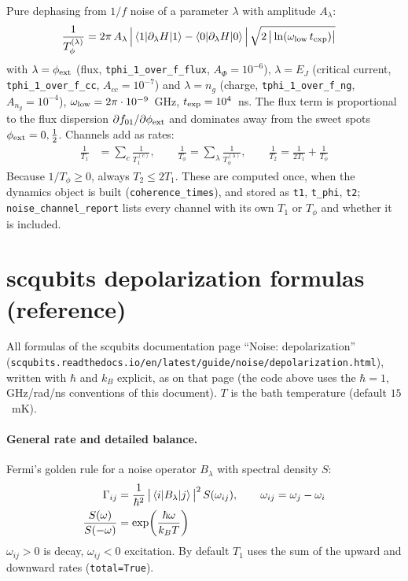 \documentclass[11pt]{article}
\begin{document}
Pure dephasing from $1/f$ noise of a parameter $\lambda$ with amplitude $A_\lambda$:
\begin{align}
  \frac{1}{T_\phi^{(\lambda)}} &= 2\pi\,A_\lambda\,
  \Big|\braket{1|\partial_\lambda H|1} - \braket{0|\partial_\lambda H|0}\Big|\,
  \sqrt{2\,\big|\ln(\omega_{\rm low}\,t_{\rm exp})\big|}
\end{align}
with $\lambda = \phi_{\rm ext}$ (flux, \texttt{tphi\_1\_over\_f\_flux}, $A_\Phi = 10^{-6}$),
$\lambda = E_J$ (critical current, \texttt{tphi\_1\_over\_f\_cc}, $A_{cc} = 10^{-7}$) and
$\lambda = n_g$ (charge, \texttt{tphi\_1\_over\_f\_ng}, $A_{n_g} = 10^{-4}$),
$\omega_{\rm low} = 2\pi\cdot 10^{-9}$~GHz, $t_{\rm exp} = 10^{4}$~ns. The flux term is
proportional to the flux dispersion $\partial f_{01}/\partial\phi_{\rm ext}$ and dominates away
from the sweet spots $\phi_{\rm ext} = 0, \tfrac12$.
Channels add as rates:
\begin{align}
  \frac{1}{T_1} &= \sum_{c} \frac{1}{T_1^{(c)}}, \qquad
  \frac{1}{T_\phi} = \sum_{\lambda} \frac{1}{T_\phi^{(\lambda)}}, \qquad
  \frac{1}{T_2} = \frac{1}{2T_1} + \frac{1}{T_\phi}
\end{align}
Because $1/T_\phi \ge 0$, always $T_2 \le 2T_1$. These are computed once, when the dynamics
object is built (\texttt{coherence\_times}), and stored as \texttt{t1}, \texttt{t\_phi},
\texttt{t2}; \texttt{noise\_channel\_report} lists every channel with its own $T_1$ or $T_\phi$
and whether it is included.

\section*{scqubits depolarization formulas (reference)}
All formulas of the scqubits documentation page ``Noise: depolarization''
(\texttt{scqubits.readthedocs.io/en/latest/guide/noise/depolarization.html}), written with
$\hbar$ and $k_B$ explicit, as on that page (the code above uses the $\hbar = 1$, GHz/rad/ns
conventions of this document). $T$ is the bath temperature (default $15$~mK).

\paragraph{General rate and detailed balance.}
Fermi's golden rule for a noise operator $B_\lambda$ with spectral density $S$:
\begin{align}
  \Gamma_{ij} &= \frac{1}{\hbar^2}\,\big|\braket{i|B_\lambda|j}\big|^2\,S(\omega_{ij}),
  \qquad \omega_{ij} = \omega_j - \omega_i \\
  \frac{S(\omega)}{S(-\omega)} &= \exp\!\left(\frac{\hbar\omega}{k_BT}\right)
\end{align}
$\omega_{ij} > 0$ is decay, $\omega_{ij} < 0$ excitation. By default $T_1$ uses the sum of the
upward and downward rates (\texttt{total=True}).
\end{document}
